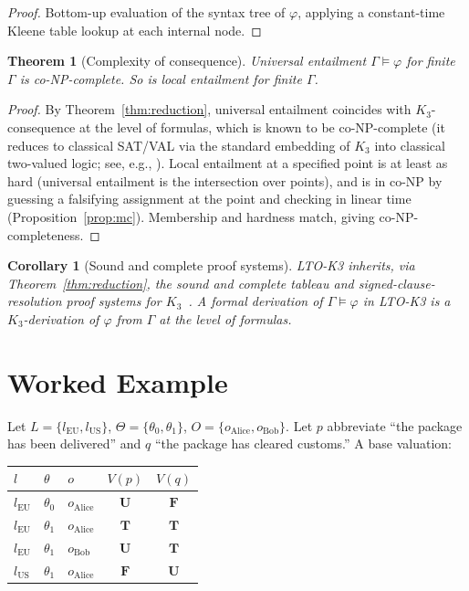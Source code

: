 \documentclass[11pt,a4paper]{article}
\theoremstyle{definition}
\theoremstyle{plain}
\newtheorem{theorem}[definition]{Theorem}
\newtheorem{corollary}[definition]{Corollary}
\theoremstyle{remark}
\newcommand{\Tv}{\mathbf{T}}
\newcommand{\Fv}{\mathbf{F}}
\newcommand{\Uv}{\mathbf{U}}
\newcommand{\entails}{\vDash}
\begin{document}
\begin{proof}
Bottom-up evaluation of the syntax tree of $\varphi$, applying a
constant-time Kleene table lookup at each internal node.
\end{proof}

\begin{theorem}[Complexity of consequence]
\label{thm:complexity}
Universal entailment $\Gamma \entails \varphi$ for finite $\Gamma$ is
co-NP-complete. So is local entailment for finite $\Gamma$.
\end{theorem}

\begin{proof}
By Theorem~\ref{thm:reduction}, universal entailment coincides with
$K_3$-consequence at the level of formulas, which is known to be
co-NP-complete (it reduces to classical SAT/VAL via the standard
embedding of $K_3$ into classical two-valued logic; see, e.g.,
\cite{hahnle1993}). Local entailment at a specified point is at least as
hard (universal entailment is the intersection over points), and is in
co-NP by guessing a falsifying assignment at the point and checking in
linear time (Proposition~\ref{prop:mc}). Membership and hardness match,
giving co-NP-completeness.
\end{proof}

\begin{corollary}[Sound and complete proof systems]
LTO-K3 inherits, via Theorem~\ref{thm:reduction}, the sound and complete
tableau and signed-clause-resolution proof systems for
$K_3$~\cite{hahnle1993}. A formal derivation of
$\Gamma \entails \varphi$ in LTO-K3 is a $K_3$-derivation of
$\varphi$ from $\Gamma$ at the level of formulas.
\end{corollary}

\section{Worked Example}
\label{sec:example}

Let $L = \{l_{\mathrm{EU}}, l_{\mathrm{US}}\}$, $\Theta = \{\theta_0,
\theta_1\}$, $O = \{o_{\mathrm{Alice}}, o_{\mathrm{Bob}}\}$. Let $p$
abbreviate ``the package has been delivered'' and $q$ ``the package has
cleared customs.'' A base valuation:

\begin{center}
\small
\begin{tabular}{lll|cc}
\toprule
$l$ & $\theta$ & $o$ & $V(p)$ & $V(q)$ \\
\midrule
$l_{\mathrm{EU}}$ & $\theta_0$ & $o_{\mathrm{Alice}}$ & $\Uv$ & $\Fv$ \\
$l_{\mathrm{EU}}$ & $\theta_1$ & $o_{\mathrm{Alice}}$ & $\Tv$ & $\Tv$ \\
$l_{\mathrm{EU}}$ & $\theta_1$ & $o_{\mathrm{Bob}}$   & $\Uv$ & $\Tv$ \\
$l_{\mathrm{US}}$ & $\theta_1$ & $o_{\mathrm{Alice}}$ & $\Fv$ & $\Uv$ \\
\bottomrule
\end{tabular}
\end{center}
\end{document}
